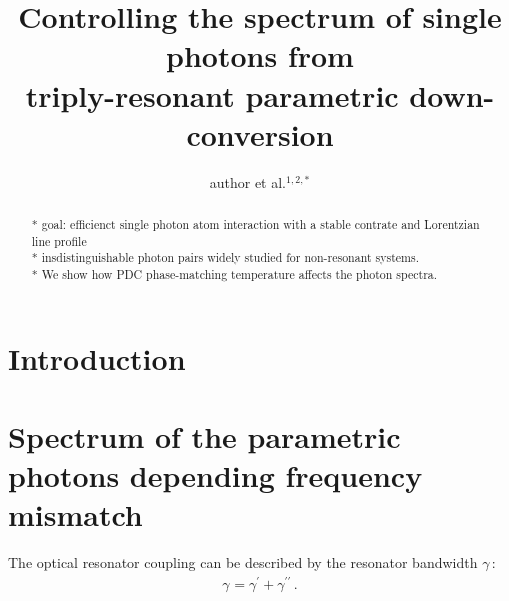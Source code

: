 \documentclass[aps,pra,showpacs,reprint,onecolumn,notitlepage]{revtex4-1}
\begin{document}
\title{Controlling the spectrum of single photons from\\ triply-resonant parametric down-conversion}
\author{author et al.$^{1,2,*}$}


\begin{abstract}
* goal: efficienct single photon atom interaction with a stable contrate and Lorentzian line profile \\
* insdistinguishable photon pairs widely studied for non-resonant systems. \\
* We show how PDC phase-matching temperature affects the photon spectra.
\end{abstract}

\maketitle 


\section{Introduction}

\section{Spectrum of the parametric photons depending frequency mismatch}
The optical resonator coupling can be described by the resonator bandwidth $\gamma\,$:
\begin{align}
	\gamma_\textrm{} = \gamma^{\prime}_\textrm{} + \gamma^{\prime\prime}_\textrm{} \, .
	\label{eq:resbandwidth}
\end{align}
\end{document}
